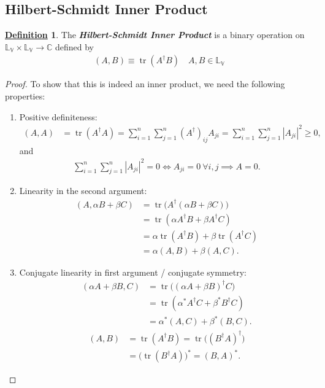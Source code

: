 \documentclass[11pt, answers]{exam}
\newcommand{\x}{\times}
\theoremstyle{definition}
\newtheorem{definition}{\underline{Definition}}[section]
\theoremstyle{bulleted}
\begin{document}
	\subsection{Hilbert-Schmidt Inner Product}
	\begin{definition}
		The \textit{\textbf{Hilbert-Schmidt Inner Product}} is a binary operation on $\mathbb{L}_\mathbb{V}\x\mathbb{L}_\mathbb{V}\rightarrow\mathbb{C}$ defined by
		\begin{align*}
			(A,B) \equiv \operatorname{tr}(A^\dagger B)\quad A,B\in \mathbb{L}_\mathbb{V}
		\end{align*}
	\end{definition}
	\begin{proof}
		To show that this is indeed an inner product, we need the following properties:
		\begin{enumerate}[label=(\arabic*)]
			\item Positive definiteness:
			\begin{align*}
				(A,A)&=\operatorname{tr}(A^\dagger A)
				=\sum_{i=1}^n\sum_{j=1}^n(A^\dagger)_{ij}A_{ji}
				=\sum_{i=1}^n\sum_{j=1}^n|A_{ji}|^2\geq0,
			\end{align*}
			and
			\begin{align*}
				\sum_{i=1}^n\sum_{j=1}^n|A_{ji}|^2=0
				\iff A_{ji}=0\ \forall i,j\implies A=0.
			\end{align*}
			
			\item Linearity in the second argument:
			\begin{align*}
				(A,\alpha B+\beta C)
				&=\operatorname{tr}\bigl(A^\dagger(\alpha B+\beta C)\bigr)\\
				&=\operatorname{tr}(\alpha A^\dagger B+\beta A^\dagger C)\\
				&=\alpha\operatorname{tr}(A^\dagger B)+\beta\operatorname{tr}(A^\dagger C)\\
				&=\alpha(A,B)+\beta(A,C).
			\end{align*}
			
			\item Conjugate linearity in first argument / conjugate symmetry:
			\begin{align*}
				(\alpha A+\beta B,C)
				&=\operatorname{tr}\bigl((\alpha A+\beta B)^\dagger C\bigr)\\
				&=\operatorname{tr}(\alpha^*A^\dagger C+\beta^*B^\dagger C)\\
				&=\alpha^*(A,C)+\beta^*(B,C).
			\end{align*}
			\begin{align*}
				(A,B)&=\operatorname{tr}(A^\dagger B)
				=\operatorname{tr}\bigl((B^\dagger A)^\dagger\bigr)\\
				&=\bigl(\operatorname{tr}(B^\dagger A)\bigr)^*=(B,A)^*.
			\end{align*}
		\end{enumerate}
	\end{proof}
\end{document}
